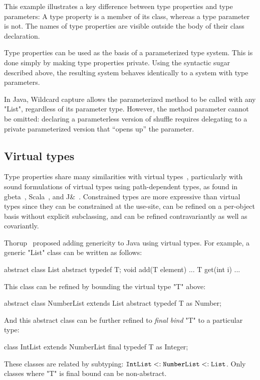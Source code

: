 \documentclass[nocopyrightspace,9pt]{sigplanconf}
\begin{document}
This example illustrates a key difference between type properties
and type parameters:
A type property is a member of its class, whereas a type parameter is
not.  The names of type properties are visible outside the body of
their class declaration.

Type properties can be used as the basis of a parameterized type
system.  This is done simply by making type properties private.
Using the syntactic sugar described above,
the resulting system behaves identically to a system with type
parameters.
\fi

In Java,
Wildcard
capture allows the parameterized method to be called with any \xcd"List",
regardless of its parameter type.
However,
the method parameter cannot be omitted: declaring a parameterless version
of shuffle requires delegating to a private parameterized version that 
``opens up'' the parameter.

\subsection{Virtual types}

Type properties share many similarities with virtual types~\cite{mp89-virtual-classes,beta}, particularly 
with sound formulations of virtual types using path-dependent types,
as found in gbeta~\cite{ernst99-gbeta}, Scala~\cite{scala}, 
and J\&~\cite{nqm06}.
%
Constrained types are more expressive than virtual
types since they can be constrained at the use-site,
can be refined on a per-object basis without explicit subclassing,
and can be refined contravariantly
as well as covariantly.

Thorup~\cite{thorup97}
proposed adding genericity to Java using virtual types.  For example,
a generic \xcd"List" class can be written as follows:
\begin{xten}
abstract class List {
    abstract typedef T;
    void add(T element) { ... }
    T get(int i) { ... }
}
\end{xten}
This class can be refined by bounding the virtual type \xcd"T" above:
\begin{xten}
abstract class NumberList extends List {
    abstract typedef T as Number;
}
\end{xten}
And this abstract class can be further refined to \emph{final bind}
\xcd"T" to a particular type:
\begin{xten}
class IntList extends NumberList {
    final typedef T as Integer;
}
\end{xten}
These classes are related by subtyping:
${\tt IntList} \subtype {\tt NumberList} \subtype {\tt List}$.
Only classes where \xcd"T" is final bound can be non-abstract.
\end{document}
